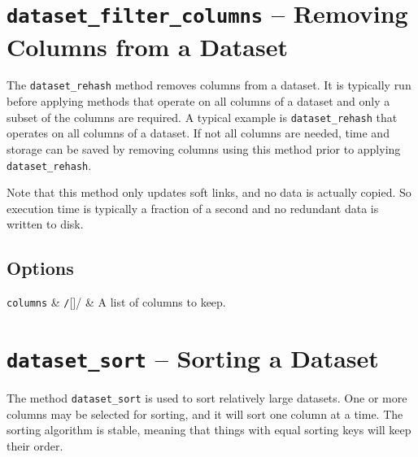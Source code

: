



\clearpage
\section{\texttt{dataset\_filter\_columns} -- Removing Columns from a Dataset}

The \texttt{dataset\_rehash} method removes columns from a dataset.
It is typically run before applying methods that operate on all
columns of a dataset and only a subset of the columns are required.  A
typical example is \texttt{dataset\_rehash} that operates on all
columns of a dataset.  If not all columns are needed, time and storage
can be saved by removing columns using this method prior to applying
\texttt{dataset\_rehash}.

Note that this method only updates soft links, and no data is actually
copied.  So execution time is typically a fraction of a second and no
redundant data is written to disk.

\subsection*{Options}
\starttable
  \RP \texttt{columns} & \texttt/[]/ & A list of columns to
  keep.\\[1ex]
\stoptable





\clearpage
\section{\texttt{dataset\_sort} -- Sorting a Dataset}
The method \texttt{dataset\_sort} is used to sort relatively large
datasets.  One or more columns may be selected for sorting, and it
will sort one column at a time.  The sorting algorithm is stable,
meaning that things with equal sorting keys will keep their order.



